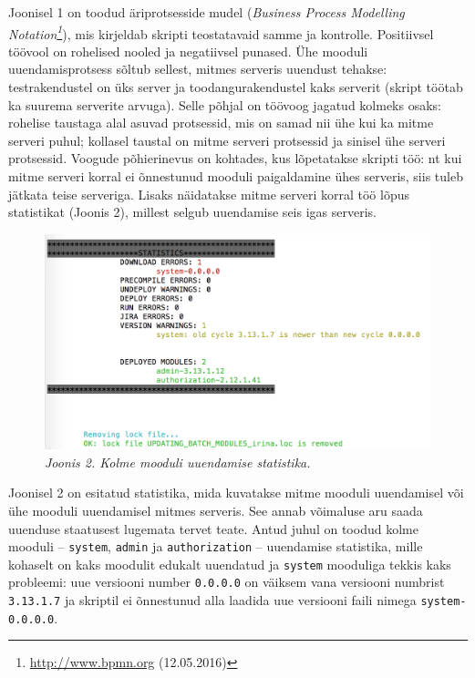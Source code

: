 \documentclass[12pt]{article}
\newcommand{\code}[1]{\texttt{#1}}
\begin{document}
   Joonisel 1 on toodud äriprotsesside mudel (\textit{Business Process Modelling Notation\footnote{\url{http://www.bpmn.org} (12.05.2016)}}), mis kirjeldab skripti teostatavaid samme ja kontrolle. Positiivsel töövool on rohelised nooled ja negatiivsel punased. Ühe mooduli uuendamisprotsess sõltub sellest, mitmes serveris uuendust tehakse: testrakendustel on üks server ja toodangurakendustel kaks serverit (skript töötab ka suurema serverite arvuga). Selle põhjal on töövoog jagatud kolmeks osaks: rohelise taustaga alal asuvad protsessid, mis on samad nii ühe kui ka mitme serveri puhul; kollasel taustal on mitme serveri protsessid ja sinisel ühe serveri protsessid. Voogude põhierinevus on kohtades, kus lõpetatakse skripti töö: nt kui mitme serveri korral ei õnnestunud mooduli paigaldamine ühes serveris, siis tuleb jätkata teise serveriga. Lisaks näidatakse mitme serveri korral töö lõpus statistikat (Joonis 2), millest selgub uuendamise seis igas serveris.
   
   \begin{figure}[H]
     \begin{center}
       \includegraphics[width=\textwidth]{screenshots/statistics.png}
       \caption*{\textit{Joonis 2. Kolme mooduli uuendamise statistika.}}
     \end{center}
   \end{figure}
   
   Joonisel 2 on esitatud statistika, mida kuvatakse mitme mooduli uuendamisel või ühe mooduli uuendamisel mitmes serveris. See annab võimaluse aru saada uuenduse staatusest lugemata tervet teate. Antud juhul on toodud kolme mooduli \--- \code{system}, \code{admin} ja \code{authorization} \--- uuendamise statistika, mille kohaselt on  kaks moodulit edukalt uuendatud ja \code{system} mooduliga tekkis kaks probleemi: uue versiooni number \code{0.0.0.0} on väiksem vana versiooni numbrist \code{3.13.1.7} ja skriptil ei õnnestunud alla laadida uue versiooni faili nimega \code{system-0.0.0.0}. 
   
\end{document}
